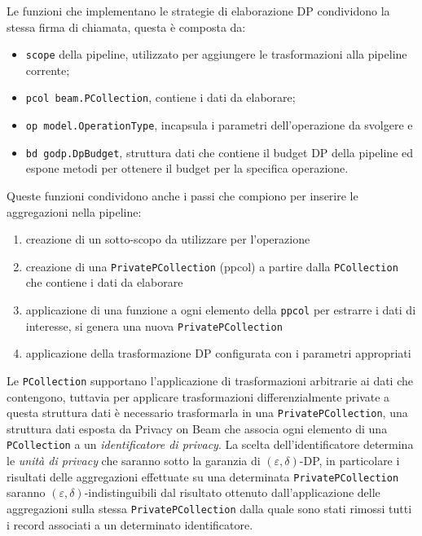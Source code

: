 Le funzioni che implementano le strategie di elaborazione DP condividono la stessa firma di chiamata, questa è composta da:
\begin{itemize}
    \item \texttt{scope} della pipeline, utilizzato per aggiungere le trasformazioni alla pipeline corrente;
    \item \texttt{pcol beam.PCollection}, contiene i dati da elaborare;
    \item \texttt{op model.OperationType}, incapsula i parametri dell'operazione da svolgere e
    \item \texttt{bd godp.DpBudget}, struttura dati che contiene il budget DP della pipeline ed espone metodi per ottenere il budget per la specifica operazione.
\end{itemize}

Queste funzioni condividono anche i passi che compiono per inserire le aggregazioni nella pipeline:
\begin{enumerate}
    \item creazione di un sotto-scopo da utilizzare per l'operazione
    \item creazione di una \texttt{PrivatePCollection} (ppcol) a partire dalla \texttt{PCollection} che contiene i dati da elaborare
    \item applicazione di una funzione a ogni elemento della \texttt{ppcol} per estrarre i dati di interesse, si genera una nuova \texttt{PrivatePCollection}
    \item applicazione della trasformazione DP configurata con i parametri appropriati
\end{enumerate}

Le \texttt{PCollection} supportano l'applicazione di trasformazioni arbitrarie ai dati che contengono, tuttavia per applicare trasformazioni differenzialmente private a questa struttura dati è necessario trasformarla in una \texttt{PrivatePCollection}, una struttura dati esposta da Privacy on Beam che associa ogni elemento di una \texttt{PCollection} a un \textit{identificatore di privacy}. La scelta dell'identificatore determina le \textit{unità di privacy} che saranno sotto la garanzia di $(\varepsilon, \delta)$-DP, in particolare i risultati delle aggregazioni effettuate su una determinata \texttt{PrivatePCollection} saranno $(\varepsilon, \delta)$-indistinguibili dal risultato ottenuto dall'applicazione delle aggregazioni sulla stessa \texttt{PrivatePCollection} dalla quale sono stati rimossi tutti i record associati a un determinato identificatore.

